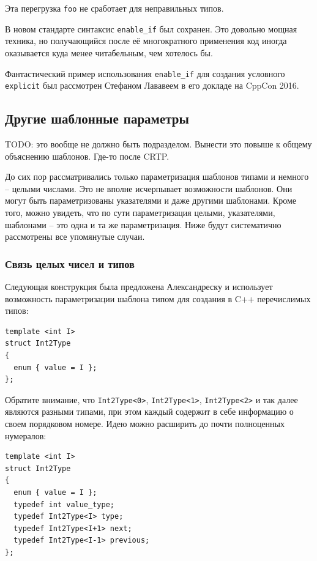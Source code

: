 \documentclass[a4paper,12pt,oneside]{article}
\begin{document}
Эта перегрузка \lstinline!foo! не сработает для неправильных типов.

В новом стандарте синтаксис \lstinline!enable_if! был сохранен. Это довольно мощная техника, но получающийся после её многократного применения код иногда оказывается куда менее читабельным, чем хотелось бы.

Фантастический пример использования \lstinline!enable_if! для создания условного \lstinline!explicit! был рассмотрен Стефаном Лававеем в его докладе на CppCon 2016.

\pagebreak
\subsection{Другие шаблонные параметры}

TODO: это вообще не должно быть подразделом. Вынести это повыше к общему объяснению шаблонов. Где-то после CRTP.

До сих пор рассматривались только параметризация шаблонов типами и немного -- целыми числами. Это не вполне исчерпывает возможности шаблонов. Они могут быть параметризованы указателями и даже другими шаблонами. Кроме того, можно увидеть, что по сути параметризация целыми, указателями, шаблонами -- это одна и та же параметризация. Ниже будут систематично рассмотрены все упомянутые случаи.

\subsubsection{Связь целых чисел и типов}\label{IntToype}

Следующая конструкция была предложена Александреску и использует возможность параметризации шаблона типом для создания в C++ перечислимых типов:

\begin{lstlisting}
template <int I>
struct Int2Type
{
  enum { value = I };
};
\end{lstlisting}

Обратите внимание, что \lstinline!Int2Type<0>!, \lstinline!Int2Type<1>!, \lstinline!Int2Type<2>! и так далее являются разными типами, при этом каждый содержит в себе информацию о своем порядковом номере. Идею можно расширить до почти полноценных нумералов:

\begin{lstlisting}
template <int I>
struct Int2Type
{
  enum { value = I };
  typedef int value_type;
  typedef Int2Type<I> type;
  typedef Int2Type<I+1> next;
  typedef Int2Type<I-1> previous;
};
\end{lstlisting}
\end{document}
